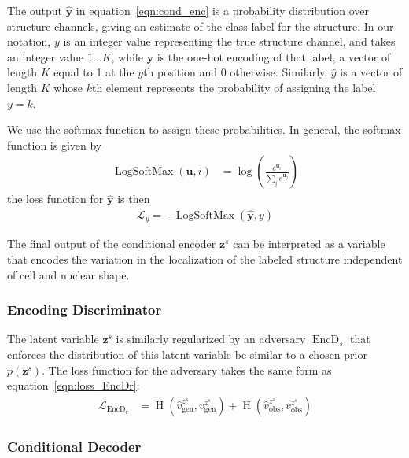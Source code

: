 \documentclass[accepted]{article}
\DeclareMathOperator{\EncD}{EncD}
\DeclareMathOperator{\logsoftmax}{LogSoftMax}
\DeclareMathOperator{\bce}{H}
\begin{document}
The output $\hat{\bm{y}}$ in equation~\ref{eqn:cond_enc} is a probability distribution over structure channels, giving an estimate of the class label for the structure.
In our notation, $y$ is an integer value representing the true structure channel, and takes an integer value $1 \ldots K$, while $\bm{y}$ is the one-hot encoding of that label, a vector of length $K$ equal to 1 at the $y$th position and 0 otherwise.
Similarly, $\hat{y}$ is a vector of length $K$ whose $k$th element represents the probability of assigning the label $y = k$.

We use the softmax function to assign these probabilities.
In general, the softmax function is given by
\begin{align}
    \logsoftmax(\bm{u}, i) &= \log \left(\frac{e^{\bm{u}_i}}{\sum_j e^{\bm{u}_j}} \right)
\end{align}
%
the loss function for $\hat{\bm{y}}$ is then
\begin{align}
    \mathcal{L}_{y} = -\logsoftmax \left( \hat{\bm{y}}, y \right)
\end{align}

The final output of the conditional encoder $\bm{z}^s$ can be interpreted as a variable that encodes the variation in the localization of the labeled structure independent of cell and nuclear shape.

\subsubsection{Encoding Discriminator}

The latent variable $\bm{z}^s$ is similarly regularized by an adversary $\EncD_s$ that enforces the distribution of this latent variable be similar to a chosen prior $p(\bm{z}^s)$.
The loss function for the adversary takes the same form as equation~\ref{eqn:loss_EncDr}:
%
\begin{align} \label{eqn:loss_EncDs}
    \mathcal{L}_{\EncD_r} &=    \bce(\hat{v}^{z^s}_{\text{gen}}, v^{z^s}_{\text{gen}}) +
                                \bce(\hat{v}^{z^s}_{\text{obs}}, v^{z^s}_{\text{obs}})
\end{align}
%

\subsubsection{Conditional Decoder}
\end{document}
